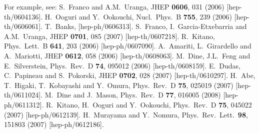 \documentclass[12pt]{article}
\begin{document}
\begin{thebibliography}{999}
For example, see:
  S.~Franco and A.M.~Uranga,
  JHEP {\bf 0606}, 031 (2006)
  [hep-th/0604136].
%
  H.~Ooguri and Y.~Ookouchi, 
  Nucl.\ Phys.\  B {\bf 755}, 239 (2006)
  [hep-th/0606061].
%  
  T.~Banks,
  [hep-ph/0606313].
%  
  S.~Franco, I.~Garcia-Etxebarria and A.M.~Uranga,
  JHEP {\bf 0701}, 085 (2007)
  [hep-th/0607218].
%
  R.~Kitano,
  Phys.\ Lett.\  B {\bf 641}, 203 (2006)
  [hep-ph/0607090].
%  
  A.~Amariti, L.~Girardello and A.~Mariotti,
  JHEP {\bf 0612}, 058 (2006)
  [hep-th/0608063].
%
  M.~Dine, J.L.~Feng and E.~Silverstein,
  Phys.\ Rev.\  D {\bf 74}, 095012 (2006)
  [hep-th/0608159].
%
  E.~Dudas, C.~Papineau and S.~Pokorski,
  JHEP {\bf 0702}, 028 (2007)
  [hep-th/0610297].
%
  H.~Abe, T.~Higaki, T.~Kobayashi and Y.~Omura,
  Phys.\ Rev.\  D {\bf 75}, 025019 (2007)
  [hep-th/0611024].
%  
  M.~Dine and J.~Mason,
  Phys.\ Rev.\  D {\bf 77}, 016005 (2008)
  [hep-ph/0611312].
%  
  R.~Kitano, H.~Ooguri and Y.~Ookouchi,
  Phys.\ Rev.\  D {\bf 75}, 045022 (2007)
  [hep-ph/0612139].
%  
  H.~Murayama and Y.~Nomura,
  Phys.\ Rev.\ Lett.\  {\bf 98}, 151803 (2007)
  [hep-ph/0612186].

\end{thebibliography}
\end{document}
